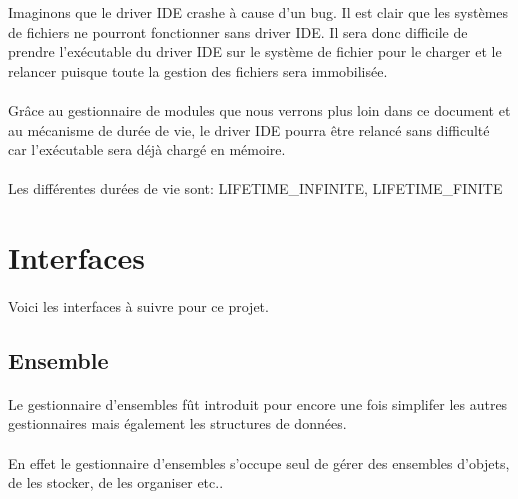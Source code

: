 \documentclass[10pt,a4wide]{article}
\begin{document}
Imaginons que le driver IDE crashe \`a cause d'un bug. Il est clair que
les syst\`emes de fichiers ne pourront fonctionner sans driver IDE. Il sera
donc difficile de prendre l'ex\'ecutable du driver IDE sur le syst\`eme
de fichier pour le charger et le relancer puisque toute la gestion
des fichiers sera immobilis\'ee.

\paragraph{}

Gr\^ace au gestionnaire de modules que nous verrons plus loin dans ce document
et au m\'ecanisme de dur\'ee de vie, le driver IDE pourra \^etre relanc\'e sans
difficult\'e car l'ex\'ecutable sera d\'ej\`a charg\'e en m\'emoire.

\paragraph{}

Les diff\'erentes dur\'ees de vie sont: LIFETIME\_INFINITE, LIFETIME\_FINITE

\section{Interfaces}

\paragraph{}

Voici les interfaces \`a suivre pour ce projet.

\subsection{Ensemble}

\paragraph{}

Le gestionnaire d'ensembles f\^ut introduit pour encore une fois simplifer
les autres gestionnaires mais \'egalement les structures de donn\'ees.

\paragraph{}

En effet le gestionnaire d'ensembles s'occupe seul de g\'erer des ensembles
d'objets, de les stocker, de les organiser etc..
\end{document}
